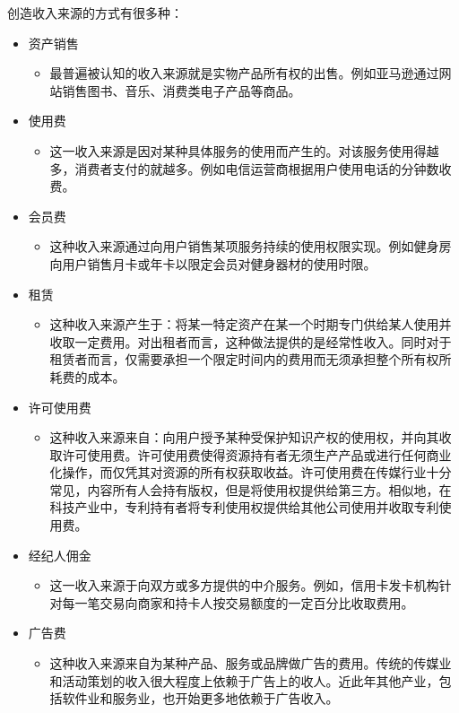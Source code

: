 	创造收入来源的方式有很多种：
	\begin{itemize}
		\item 资产销售
		\begin{itemize}
			\item 最普遍被认知的收入来源就是实物产品所有权的出售。例如亚马逊通过网站销售图书、音乐、消费类电子产品等商品。
		\end{itemize}
		\item 使用费
		\begin{itemize}
			\item 这一收入来源是因对某种具体服务的使用而产生的。对该服务使用得越多，消费者支付的就越多。例如电信运营商根据用户使用电话的分钟数收费。
		\end{itemize}
		\item 会员费
		\begin{itemize}
			\item 这种收入来源通过向用户销售某项服务持续的使用权限实现。例如健身房向用户销售月卡或年卡以限定会员对健身器材的使用时限。
		\end{itemize}
		\item 租赁
		\begin{itemize}
			\item 这种收入来源产生于：将某一特定资产在某一个时期专门供给某人使用并收取一定费用。对出租者而言，这种做法提供的是经常性收入。同时对于租赁者而言，仅需要承担一个限定时间内的费用而无须承担整个所有权所耗费的成本。
		\end{itemize}
		\item 许可使用费
		\begin{itemize}
			\item 这种收入来源来自：向用户授予某种受保护知识产权的使用权，并向其收取许可使用费。许可使用费使得资源持有者无须生产产品或进行任何商业化操作，而仅凭其对资源的所有权获取收益。许可使用费在传媒行业十分常见，内容所有人会持有版权，但是将使用权提供给第三方。相似地，在科技产业中，专利持有者将专利使用权提供给其他公司使用并收取专利使用费。
		\end{itemize}
		\item 经纪人佣金
		\begin{itemize}
			\item 这一收入来源于向双方或多方提供的中介服务。例如，信用卡发卡机构针对每一笔交易向商家和持卡人按交易额度的一定百分比收取费用。
		\end{itemize}
		\item 广告费
		\begin{itemize}
			\item 这种收入来源来自为某种产品、服务或品牌做广告的费用。传统的传媒业和活动策划的收入很大程度上依赖于广告上的收人。近此年其他产业，包括软件业和服务业，也开始更多地依赖于广告收入。
		\end{itemize}
	\end{itemize}

